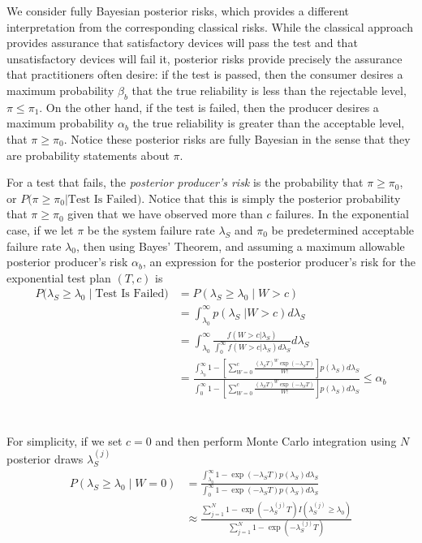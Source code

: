 \documentclass[12pt]{article}
\begin{document}
We consider fully Bayesian posterior risks, which provides a
different interpretation from the corresponding classical risks.  While the classical approach
provides assurance that satisfactory devices will pass the test and that
unsatisfactory devices will fail it, posterior risks provide precisely the
assurance that practitioners often desire: if the test is passed, then the
consumer desires a maximum probability $\beta_b$ that the true reliability is less than the rejectable level, $\pi \leq \pi_1$. On the
other hand, if the test is failed, then the producer desires a maximum
probability $\alpha_b$ the true reliability is greater than the acceptable level, that $\pi \geq \pi_0$. Notice these posterior risks are fully Bayesian in the sense that they are probability statements about $\pi$.

For a test that fails, the \emph{posterior producer's risk} is the probability
that $\pi \geq \pi_{0}$, or $P \text{(}\pi \ge \pi_0 \vert \text{Test Is
Failed)}$. Notice that this is simply the posterior probability that $\pi \ge
\pi_0$ given that we have observed more than $c$ failures. In the exponential
case, if we let $\pi$ be the system failure rate $\lambda_S$ and $\pi_0$ be
predetermined acceptable failure rate $\lambda_0$, then using Bayes' Theorem,
and assuming a maximum allowable posterior producer's risk $\alpha_b$, an
expression for the posterior producer's risk for the exponential test plan
$(T,c)$ is
$$
\begin{aligned}
    P(\lambda_S \geq \lambda_0 \; \vert \; \text{Test Is Failed)} &= P(\lambda_S
    \geq \lambda_0 \; \vert \; W > c) \\ &= \int_{\lambda_0}^{\infty}
    p(\lambda_S \; \vert W > c) d\lambda_S \\ &= \int_{\lambda_0}^{\infty}
    \frac{f(W > c \vert \lambda_S)}{\int_{0}^{\infty} f(W > c \vert \lambda_S)
    d\lambda_S} d\lambda_S \\ &= \frac{\int_{\lambda_0}^{\infty} 1 - [ \sum_{W=0}^c
    \frac{(\lambda_S T)^W \exp(-\lambda_S T)}{W!}]p(\lambda_S)d\lambda_S}
    {\int_{0}^{\infty} 1 - [ \sum_{W=0}^c \frac{(\lambda_S T)^W \exp(-\lambda_S
    T)}{W!}]p(\lambda_S)d\lambda_S} \leq \alpha_b
\end{aligned}
$$
\\
\\
For simplicity, if we set $c = 0$ and then perform Monte Carlo integration
using $N$ posterior draws $ \lambda_S^{(j)} $
$$
\begin{aligned}
	 P(\lambda_S \geq \lambda_0 \; \vert \; W = 0) &=
	 \frac{\int_{\lambda_0}^{\infty} 1 - \exp(-\lambda_S T)p(\lambda_S)d\lambda_S}
	 {\int_{0}^{\infty} 1 - \exp(-\lambda_S T)p(\lambda_S)d\lambda_S} \\ &\approx
	 \frac{\sum_{j = 1}^{N} 1 - \exp(-\lambda_S^{(j)} T)I(\lambda_S^{(j)} \geq
	 \lambda_0)} {\sum_{j = 1}^{N} 1 - \exp(-\lambda_S^{(j)} T)} \end{aligned}
$$
\end{document}
